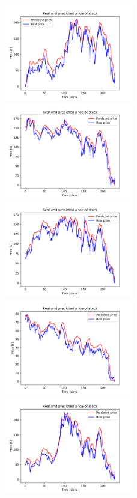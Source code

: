 \begin{figure}
\includegraphics[width=0.5\textwidth]{./graf/model2/AAPL.png}
\includegraphics[width=0.5\textwidth]{./graf/model2/AMZN.png}
\includegraphics[width=0.5\textwidth]{./graf/model2/GOOGL.png}
\includegraphics[width=0.5\textwidth]{./graf/model2/LYFT.png}
\includegraphics[width=0.5\textwidth]{./graf/model2/NVDA.png}

\end{figure}
